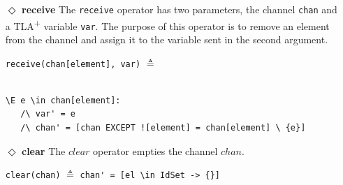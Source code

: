 \documentclass{thesul}
\newcommand{\tlaplus}{TLA\textsuperscript{+}\xspace}
\begin{document}
\begin{itemize}
The \verb|multicast| operator takes two parameters, the channel \verb|chan| and a \tlaplus expression. The second parameter specifies the intended recipients of the message and the message to be sent. The purpose of this operator is to send a \verb|msg| to some channels that are designated by the \verb|chan|. The receiving channels are the ones that satisfy the set \verb|bub| specified by the programmer in the second argument.

\begin{minipage}{.4\textwidth}

\lstinline!multicast(chan, [a \in sub |-> msg])! $\triangleq$\\\\\\
\end{minipage}\hfill
\begin{minipage}{.8\textwidth}
\begin{lstlisting}[frame = none, numbers = none]
chan' = [a \in DOMAIN chan |-> 
					IF a \in sub
					THEN chan[a] \cup {msg}
					ELSE chan[a]]
\end{lstlisting}

\end{minipage}\hfill

\item[$\Diamond$]  \textbf{receive}
The \verb|receive| operator has two parameters, the channel \verb|chan| and a \tlaplus variable \verb|var|. The purpose of this operator is to remove an element from the channel and assign it to the variable sent in the second argument.

\begin{minipage}{.33\textwidth}

\lstinline|receive(chan[element], var)| $\triangleq$\\\\
\end{minipage}\hfill
\begin{minipage}{\textwidth}
\begin{lstlisting}[frame = none, numbers = none]
\E e \in chan[element]:
   /\ var' = e
   /\ chan' = [chan EXCEPT ![element] = chan[element] \ {e}]
\end{lstlisting}

\end{minipage}\hfill

\item[$\Diamond$]  \textbf{clear}
The $clear$ operator empties the channel $chan$.

\lstinline|clear(chan)| $\triangleq$
\lstinline|chan' = [el \in IdSet -> {}]|

\end{itemize}
\end{document}
